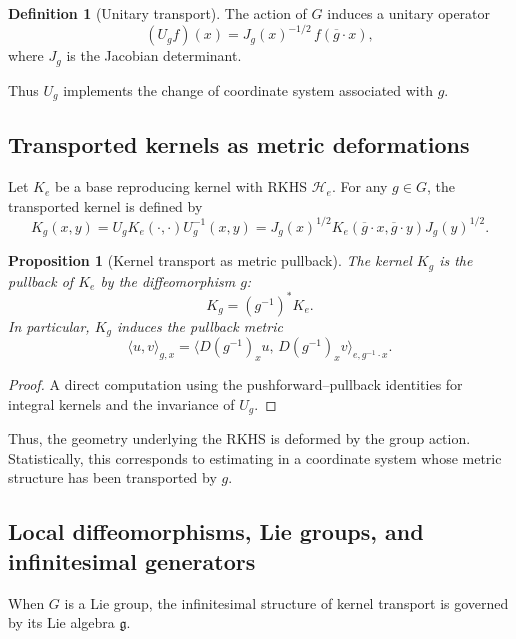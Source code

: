 \documentclass[11pt]{article}
\newtheorem{proposition}[theorem]{Proposition}
\theoremstyle{definition}
\newtheorem{definition}[theorem]{Definition}
\begin{document}
\begin{definition}[Unitary transport]
	The action of $G$ induces a unitary operator
	\[
	(U_g f)(x)
	= J_{g}(x)^{-1/2}\, f(\overline{g}\cdot x),
	\]
	where $J_g$ is the Jacobian determinant.
\end{definition}

Thus $U_g$ implements the change of coordinate system associated with $g$.

\subsection{Transported kernels as metric deformations}

Let $K_e$ be a base reproducing kernel with RKHS $\mathcal{H}_e$.
For any $g\in G$, the transported kernel is defined by
\[
K_g(x,y)
= U_g K_e(\cdot,\cdot) U_g^{-1}(x,y)
= J_g(x)^{1/2} K_e(\overline{g}\cdot x,\overline{g}\cdot y)
J_g(y)^{1/2}.
\]

\begin{proposition}[Kernel transport as metric pullback]
	The kernel $K_g$ is the pullback of $K_e$ by the diffeomorphism $g$:
	\[
	K_g = (g^{-1})^\ast K_e.
	\]
	In particular, $K_g$ induces the pullback metric
	\[
	\langle u,v\rangle_{g,x}
	= \langle D(g^{-1})_x u,\, D(g^{-1})_x v\rangle_{e,g^{-1}\cdot x}.
	\]
\end{proposition}

\begin{proof}
	A direct computation using the pushforward–pullback identities for integral kernels and the invariance of $U_g$.
\end{proof}

Thus, the geometry underlying the RKHS is deformed by the group action.
Statistically, this corresponds to estimating in a coordinate system whose metric structure has been transported by $g$.

\subsection{Local diffeomorphisms, Lie groups, and infinitesimal generators}

When $G$ is a Lie group, the infinitesimal structure of kernel transport is governed by its Lie algebra $\mathfrak{g}$.
\end{document}
